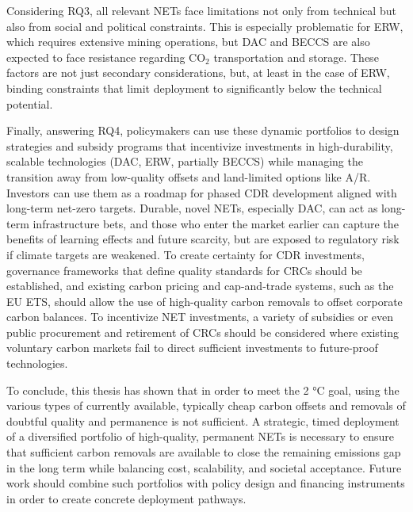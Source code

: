 Considering RQ3, all relevant NETs face limitations not only from technical but also from social and political constraints. This is especially problematic for ERW, which requires extensive mining operations, but DAC and BECCS are also expected to face resistance regarding CO$_2$ transportation and storage. These factors are not just secondary considerations, but, at least in the case of ERW, binding constraints that limit deployment to significantly below the technical potential.\vspace{2mm}

\clearpage
Finally, answering RQ4, policymakers can use these dynamic portfolios to design strategies and subsidy programs that incentivize investments in high-durability, scalable technologies (DAC, ERW, partially BECCS) while managing the transition away from low-quality offsets and land-limited options like A/R. Investors can use them as a roadmap for phased CDR development aligned with long-term net-zero targets. Durable, novel NETs, especially DAC, can act as long-term infrastructure bets, and those who enter the market earlier can capture the benefits of learning effects and future scarcity, but are exposed to regulatory risk if climate targets are weakened. To create certainty for CDR investments, governance frameworks that define quality standards for CRCs should be established, and existing carbon pricing and cap-and-trade systems, such as the EU ETS, should allow the use of high-quality carbon removals to offset corporate carbon balances. To incentivize NET investments, a variety of subsidies or even public procurement and retirement of CRCs should be considered where existing voluntary carbon markets fail to direct sufficient investments to future-proof technologies.\vspace{2mm}

To conclude, this thesis has shown that in order to meet the 2 °C goal, using the various types of currently available, typically cheap carbon offsets and removals of doubtful quality and permanence is not sufficient. A strategic, timed deployment of a diversified portfolio of high-quality, permanent NETs is necessary to ensure that sufficient carbon removals are available to close the remaining emissions gap in the long term while balancing cost, scalability, and societal acceptance. Future work should combine such portfolios with policy design and financing instruments in order to create concrete deployment pathways.